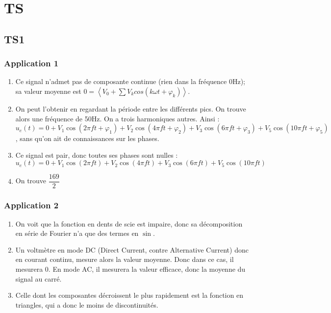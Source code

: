 \documentclass[a4paper,12pt]{book}
\begin{document}
\chapter{TS}
\section{TS1}
\subsection{Application 1}
\begin{enumerate}
\item Ce signal n'admet pas de composante continue (rien dans la fréquence 0Hz); sa valeur moyenne est $0 = \left<V_0 + \sum V_kcos(k\omega t+\varphi_k)\right>$.
\item On peut l'obtenir en regardant la période entre les différents pics. On trouve alors une fréquence de 50Hz. On a trois harmoniques autres. Ainsi : $u_e(t) = 0 + V_1\cos(2\pi ft+ \varphi_1) + V_2\cos(4\pi ft+ \varphi_2) + V_3\cos(6\pi ft+ \varphi_3) + V_5\cos(10\pi ft + \varphi_5)$, sans qu'on ait de connaissances sur les phases.
\item Ce signal est pair, donc toutes ses phases sont nulles : $u_e(t) = 0 + V_1\cos(2\pi ft) + V_2\cos(4\pi ft) + V_3\cos(6\pi ft) + V_5\cos(10\pi ft)$
\item On trouve $\dfrac{169}{2}$
\end{enumerate}

\subsection{Application 2}
\begin{enumerate}
\item On voit que la fonction en dents de scie est impaire, donc sa décomposition en série de Fourier n'a que des termes en $\sin$.
\item Un voltmètre en mode DC (Direct Current, contre Alternative Current) donc en courant continu, mesure alors la valeur moyenne. Donc dans ce cas, il mesurera 0. En mode AC, il mesurera la valeur efficace, donc la moyenne du signal au carré.
\item Celle dont les composantes décroissent le plus rapidement est la fonction en triangles, qui a donc le moins de discontinuités.
\end{enumerate}
\end{document}
